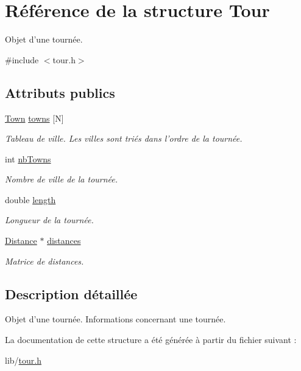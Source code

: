\hypertarget{structTour}{
\section{Référence de la structure Tour}
\label{structTour}
}


Objet d'une tournée.  




{\ttfamily \#include $<$tour.h$>$}

\subsection*{Attributs publics}
\begin{DoxyCompactItemize}
\item 
\hypertarget{structTour_ab50c14f153f1a4b16788d31d9d845c69}{
\hyperlink{structTown}{Town} \hyperlink{structTour_ab50c14f153f1a4b16788d31d9d845c69}{towns} \mbox{[}N\mbox{]}}
\label{structTour_ab50c14f153f1a4b16788d31d9d845c69}

\begin{DoxyCompactList}\small\item\em Tableau de ville. Les villes sont triés dans l'ordre de la tournée. \item\end{DoxyCompactList}\item 
\hypertarget{structTour_af54d0892d0de565850fdf26e98b90a03}{
int \hyperlink{structTour_af54d0892d0de565850fdf26e98b90a03}{nbTowns}}
\label{structTour_af54d0892d0de565850fdf26e98b90a03}

\begin{DoxyCompactList}\small\item\em Nombre de ville de la tournée. \item\end{DoxyCompactList}\item 
\hypertarget{structTour_ad7ec8574d813b76140f78b035cdd93a9}{
double \hyperlink{structTour_ad7ec8574d813b76140f78b035cdd93a9}{length}}
\label{structTour_ad7ec8574d813b76140f78b035cdd93a9}

\begin{DoxyCompactList}\small\item\em Longueur de la tournée. \item\end{DoxyCompactList}\item 
\hypertarget{structTour_a4da8a499459d000a23d79af9d1a5565d}{
\hyperlink{structDistance}{Distance} $\ast$ \hyperlink{structTour_a4da8a499459d000a23d79af9d1a5565d}{distances}}
\label{structTour_a4da8a499459d000a23d79af9d1a5565d}

\begin{DoxyCompactList}\small\item\em Matrice de distances. \item\end{DoxyCompactList}\end{DoxyCompactItemize}


\subsection{Description détaillée}
Objet d'une tournée. Informations concernant une tournée. 

La documentation de cette structure a été générée à partir du fichier suivant :\begin{DoxyCompactItemize}
\item 
lib/\hyperlink{tour_8h}{tour.h}\end{DoxyCompactItemize}
